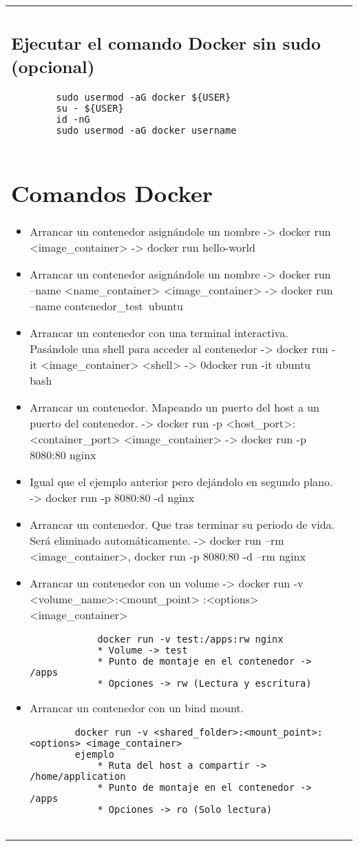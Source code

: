 \documentclass[letterpaper,11pt]{article}
\begin{document}
\begin{tabular*}{7in}{l@{\extracolsep{\fill}}r}
\begin{itemize}
    \end{itemize}
    
    \subsection{Ejecutar el comando Docker sin sudo (opcional)}
    
    \begin{lstlisting}
        sudo usermod -aG docker ${USER}
        su - ${USER}
        id -nG
        sudo usermod -aG docker username
    
    \end{lstlisting}
    
    \section{Comandos Docker}\label{comansDocker}
    
    \begin{itemize}
        \item Arrancar un contenedor asignándole un nombre -> docker run <image\_container> -> docker run hello-world
        \item Arrancar un contenedor asignándole un nombre -> docker run --name <name\_container> <image\_container> -> docker run --name contenedor\_test\ ubuntu 
        \item Arrancar un contenedor con una terminal interactiva. Pasándole una shell para acceder al contenedor -> docker run -it <image\_container> <shell> -> 0docker run -it ubuntu bash
        \item Arrancar un contenedor. Mapeando un puerto del host a un puerto del contenedor. -> docker run -p <host\_port>:<container\_port> <image\_container> -> docker run -p 8080:80 nginx 
        \item Igual que el ejemplo anterior pero dejándolo en segundo plano. -> docker run -p 8080:80 -d nginx
        \item Arrancar un contenedor. Que tras terminar su periodo de vida. Será eliminado automáticamente. -> docker run --rm <image\_container>, docker run -p 8080:80 -d --rm nginx
        \item Arrancar un contenedor con un volume -> docker run -v <volume\_name>:<mount\_point>
        :<options> <image\_container>
        \begin{lstlisting}
            docker run -v test:/apps:rw nginx
            * Volume -> test
            * Punto de montaje en el contenedor -> /apps
            * Opciones -> rw (Lectura y escritura)
        \end{lstlisting}
        \item Arrancar un contenedor con un bind mount. 
        \begin{lstlisting}
        docker run -v <shared_folder>:<mount_point>:<options> <image_container>
        ejemplo
            * Ruta del host a compartir -> /home/application
            * Punto de montaje en el contenedor -> /apps
            * Opciones -> ro (Solo lectura)
    

\end{lstlisting}
\end{itemize}
\end{tabular*}
\end{document}
